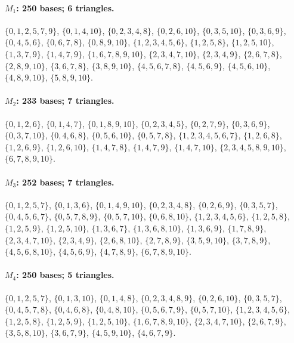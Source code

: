 
\paragraph{$M_{1}$: 250 bases; 6 triangles.}
\(\{0,1,2,5,7,9\}\), \(\{0,1,4,10\}\), \(\{0,2,3,4,8\}\), \(\{0,2,6,10\}\), \(\{0,3,5,10\}\), \(\{0,3,6,9\}\), \(\{0,4,5,6\}\), \(\{0,6,7,8\}\), \(\{0,8,9,10\}\), \(\{1,2,3,4,5,6\}\), \(\{1,2,5,8\}\), \(\{1,2,5,10\}\), \(\{1,3,7,9\}\), \(\{1,4,7,9\}\), \(\{1,6,7,8,9,10\}\), \(\{2,3,4,7,10\}\), \(\{2,3,4,9\}\), \(\{2,6,7,8\}\), \(\{2,8,9,10\}\), \(\{3,6,7,8\}\), \(\{3,8,9,10\}\), \(\{4,5,6,7,8\}\), \(\{4,5,6,9\}\), \(\{4,5,6,10\}\), \(\{4,8,9,10\}\), \(\{5,8,9,10\}\).

\paragraph{$M_{2}$: 233 bases; 7 triangles.}
\(\{0,1,2,6\}\), \(\{0,1,4,7\}\), \(\{0,1,8,9,10\}\), \(\{0,2,3,4,5\}\), \(\{0,2,7,9\}\), \(\{0,3,6,9\}\), \(\{0,3,7,10\}\), \(\{0,4,6,8\}\), \(\{0,5,6,10\}\), \(\{0,5,7,8\}\), \(\{1,2,3,4,5,6,7\}\), \(\{1,2,6,8\}\), \(\{1,2,6,9\}\), \(\{1,2,6,10\}\), \(\{1,4,7,8\}\), \(\{1,4,7,9\}\), \(\{1,4,7,10\}\), \(\{2,3,4,5,8,9,10\}\), \(\{6,7,8,9,10\}\).

\paragraph{$M_{3}$: 252 bases; 7 triangles.}
\(\{0,1,2,5,7\}\), \(\{0,1,3,6\}\), \(\{0,1,4,9,10\}\), \(\{0,2,3,4,8\}\), \(\{0,2,6,9\}\), \(\{0,3,5,7\}\), \(\{0,4,5,6,7\}\), \(\{0,5,7,8,9\}\), \(\{0,5,7,10\}\), \(\{0,6,8,10\}\), \(\{1,2,3,4,5,6\}\), \(\{1,2,5,8\}\), \(\{1,2,5,9\}\), \(\{1,2,5,10\}\), \(\{1,3,6,7\}\), \(\{1,3,6,8,10\}\), \(\{1,3,6,9\}\), \(\{1,7,8,9\}\), \(\{2,3,4,7,10\}\), \(\{2,3,4,9\}\), \(\{2,6,8,10\}\), \(\{2,7,8,9\}\), \(\{3,5,9,10\}\), \(\{3,7,8,9\}\), \(\{4,5,6,8,10\}\), \(\{4,5,6,9\}\), \(\{4,7,8,9\}\), \(\{6,7,8,9,10\}\).

\paragraph{$M_{4}$: 250 bases; 5 triangles.}
\(\{0,1,2,5,7\}\), \(\{0,1,3,10\}\), \(\{0,1,4,8\}\), \(\{0,2,3,4,8,9\}\), \(\{0,2,6,10\}\), \(\{0,3,5,7\}\), \(\{0,4,5,7,8\}\), \(\{0,4,6,8\}\), \(\{0,4,8,10\}\), \(\{0,5,6,7,9\}\), \(\{0,5,7,10\}\), \(\{1,2,3,4,5,6\}\), \(\{1,2,5,8\}\), \(\{1,2,5,9\}\), \(\{1,2,5,10\}\), \(\{1,6,7,8,9,10\}\), \(\{2,3,4,7,10\}\), \(\{2,6,7,9\}\), \(\{3,5,8,10\}\), \(\{3,6,7,9\}\), \(\{4,5,9,10\}\), \(\{4,6,7,9\}\).

